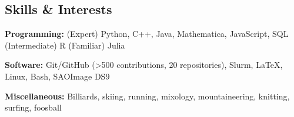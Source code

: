\documentclass[12pt,letterpaper]{article}
\begin{document}
\subsection{Skills \& Interests}
\begin{list}{}{\cvlist}
  \item \textbf{Programming:} (Expert) Python, C++, Java, Mathematica, JavaScript, SQL (Intermediate) R (Familiar) Julia
  \item \textbf{Software:} Git/GitHub (>500 contributions, 20 repositories), Slurm, \LaTeX, Linux, Bash, SAOImage DS9
  \item \textbf{Miscellaneous:} Billiards, skiing, running, mixology, mountaineering, knitting, surfing, foosball
\end{list}
\end{document}
